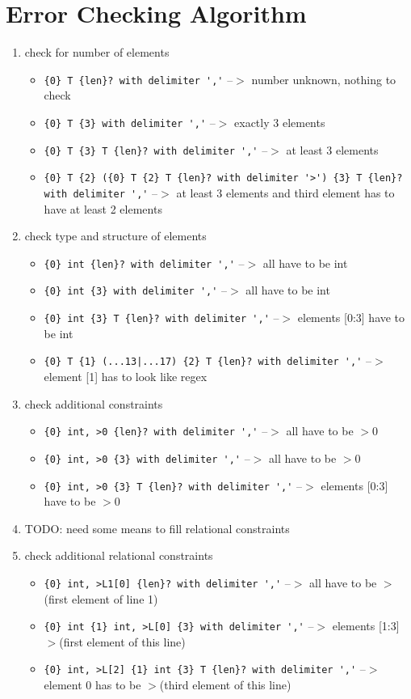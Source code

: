 \documentclass[11pt]{article}
\begin{document}

\section{Error Checking Algorithm}

\begin{enumerate}
\item check for number of elements
\begin{itemize}
\item \verb|{0} T {len}? with delimiter ','| --$>$ number unknown, nothing to check
\item \verb|{0} T {3} with delimiter ','| --$>$ exactly 3 elements
\item \verb|{0} T {3} T {len}? with delimiter ','| --$>$ at least 3 elements
\item \verb|{0} T {2} ({0} T {2} T {len}? with delimiter '>') {3} T {len}? with delimiter ','| --$>$ at least 3 elements and third element has to have at least 2 elements
\end{itemize}
\item check type and structure of elements
\begin{itemize}
\item \verb|{0} int {len}? with delimiter ','| --$>$ all have to be int
\item \verb|{0} int {3} with delimiter ','| --$>$ all have to be int
\item \verb|{0} int {3} T {len}? with delimiter ','| --$>$ elements [0:3] have to be int
\item \verb;{0} T {1} (...13|...17) {2} T {len}? with delimiter ','; --$>$ element [1] has to look like regex
\end{itemize}
\item check additional constraints
\begin{itemize}
\item \verb|{0} int, >0 {len}? with delimiter ','| --$>$ all have to be $>$0
\item \verb|{0} int, >0 {3} with delimiter ','| --$>$ all have to be $>$0
\item \verb|{0} int, >0 {3} T {len}? with delimiter ','| --$>$ elements [0:3] have to be $>$0
\end{itemize}
\item TODO: need some means to fill relational constraints
\item check additional relational constraints
\begin{itemize}
\item \verb|{0} int, >L1[0] {len}? with delimiter ','| --$>$ all have to be $>$(first element of line 1)
\item \verb|{0} int {1} int, >L[0] {3} with delimiter ','| --$>$ elements [1:3] $>$(first element of this line)
\item \verb|{0} int, >L[2] {1} int {3} T {len}? with delimiter ','| --$>$ element 0 has to be $>$(third element of this line)
\end{itemize}
\end{enumerate}
\end{document}
